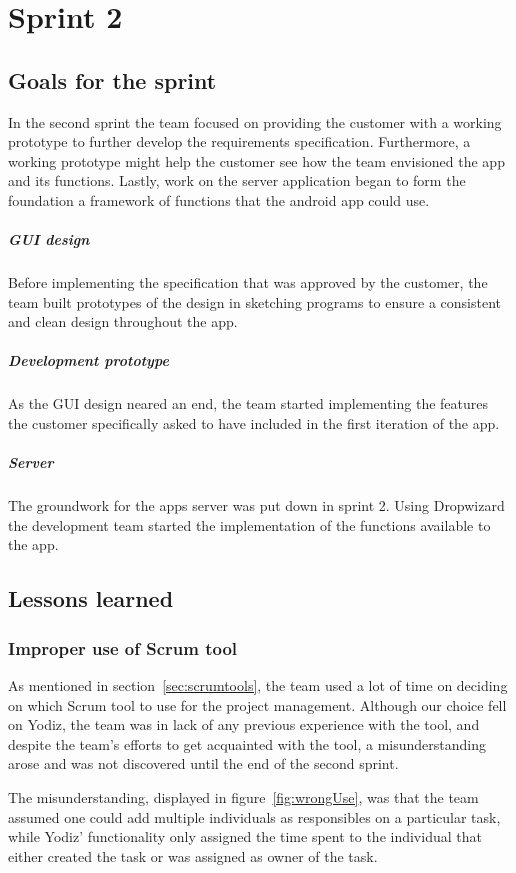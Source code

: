 \section{Sprint 2}

\subsection{Goals for the sprint}
In the second sprint the team focused on providing the customer with a working prototype to further develop the requirements specification. Furthermore, a working prototype might help the customer see how the team envisioned the app and its functions. Lastly, work on the server application began to form the foundation a framework of functions that the android app could use.

\subparagraph{GUI design}
Before implementing the specification that was approved by the customer, the team built prototypes of the design in sketching programs to ensure a consistent and clean design throughout the app. 

\subparagraph{Development prototype}
As the GUI design neared an end, the team started implementing the features the customer specifically asked to have included in the first iteration of the app.

\subparagraph{Server}
The groundwork for the apps server was put down in sprint 2. Using Dropwizard the development team started the implementation of the functions available to the app.

\subsection{Lessons learned}

\subsubsection{Improper use of Scrum tool}
As mentioned in section~\ref{sec:scrumtools}, the team used a lot of time on deciding on which Scrum tool to use for the project management. Although our choice fell on Yodiz, the team was in lack of any previous experience with the tool, and despite the team's efforts to get acquainted with the tool, a misunderstanding arose and was not discovered until the end of the second sprint.

The misunderstanding, displayed in figure~\ref{fig:wrongUse}, was that the team assumed one could add multiple individuals as responsibles on a particular task, while Yodiz' functionality only assigned the time spent to the individual that either created the task or was assigned as owner of the task.

